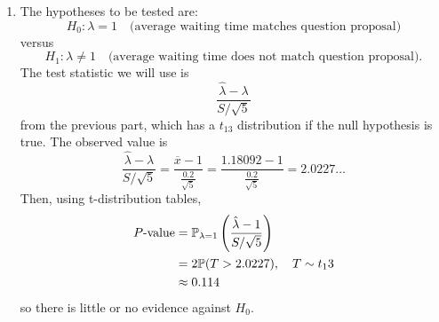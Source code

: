 \documentclass{article}
\begin{document}
\begin{enumerate}
    \item The hypotheses to be tested are: \[H_0: \lambda = 1 \quad \text{(average waiting time matches question proposal)}\] versus \[H_1: \lambda \neq 1 \quad \text{(average waiting time does not match question proposal)}.\]The test statistic we will use is \[\dfrac{\hat{\lambda} - \lambda}{S/\sqrt{5}}\] from the previous part, which has a $t_13$ distribution if the null hypothesis is true. The observed value is \[\dfrac{\hat{\lambda} - \lambda}{S/\sqrt{5}} = \dfrac{\overline{x} - 1}{\frac{0.2}{\sqrt{5}}} = \frac{1.18092 - 1}{\frac{0.2}{\sqrt{5}}}=2.0227\ldots\]Then, using t-distribution tables,
    \begin{align}
        P\text{-value} &= \mathbb{P}_{\lambda = 1}\left(\dfrac{\hat{\lambda} - 1}{S/\sqrt{5}}\right) \notag \\
        &= 2 \mathbb{P}(T > 2.0227), \quad T \sim t_13 \notag \\
        &\approx 0.114 \notag
    \end{align}
    so there is little or no evidence against $H_0$.
\end{enumerate}
\end{document}
